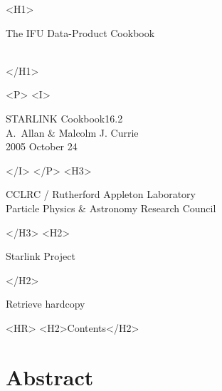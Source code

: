 \documentclass[twoside,11pt]{article}
\newcommand{\stardoccategory}  {STARLINK Cookbook}
\newcommand{\stardocsource}    {sc\stardocnumber}
\newcommand{\stardocnumber}    {16.2}
\newcommand{\stardocauthors}   {A.~Allan \& Malcolm J. Currie}
\newcommand{\stardocdate}      {2005 October 24}
\newcommand{\stardoctitle}     {The IFU Data-Product Cookbook}
\newcommand{\htmladdnormallink}[2]{#1}
\newcommand{\htmladdimg}[1]{}
\newcommand{\htmlref}[2]{#1}
\newcommand{\htmladdtonavigation}[1]{}
\newcommand{\xlabel}[1]{}
\newcommand{\latexonlytoc}[0]{\tableofcontents}
\begin{document}
\begin{htmlonly}
   \xlabel{}
   \begin{rawhtml} <H1> \end{rawhtml}
      \stardoctitle\\
      \stardocversion\\
      \stardocmanual
   \begin{rawhtml} </H1> \end{rawhtml}

   \htmladdimg{sc16_cover.gif}


   \begin{rawhtml} <P> <I> \end{rawhtml}
   \stardoccategory \stardocnumber \\
   \stardocauthors \\
   \stardocdate
   \begin{rawhtml} </I> </P> <H3> \end{rawhtml}
      \htmladdnormallink{CCLRC}{http://www.cclrc.ac.uk} /
      \htmladdnormallink{Rutherford Appleton Laboratory}
                        {http://www.cclrc.ac.uk/ral} \\
      \htmladdnormallink{Particle Physics \& Astronomy Research Council}
                        {http://www.pparc.ac.uk} \\
   \begin{rawhtml} </H3> <H2> \end{rawhtml}
      \htmladdnormallink{Starlink Project}{http://star-www.rl.ac.uk/}
   \begin{rawhtml} </H2> \end{rawhtml}
   \htmladdnormallink{\htmladdimg{source.gif} Retrieve hardcopy}
      {http://star-www.rl.ac.uk/cgi-bin/hcserver?\stardocsource}\\

  \label{stardoccontents}
  \begin{rawhtml} 
    <HR>
    <H2>Contents</H2>
  \end{rawhtml}
  \renewcommand{\latexonlytoc}[0]{}

  \section{\xlabel{abstract}Abstract}
\end{htmlonly}
\end{document}
